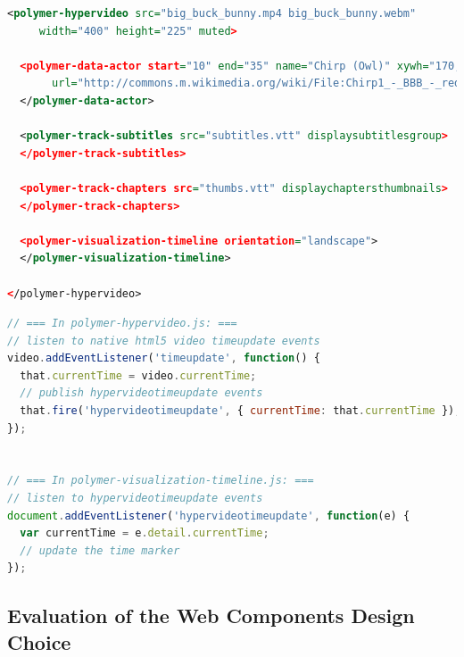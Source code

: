 \documentclass[runningheads,a4paper]{llncs}
\begin{document}
\begin{lstlisting}[caption={Web Components mark-up for the hypervideo in \autoref{fig:screenshot}, including subtitles, chapters, timeline, and table of contents; the actor annotation contains a~spatial fragment
(\texttt{xywh})~\cite{troncy2012mediafragments} and a~link (\texttt{url})
  to Wikimedia Commons},
  label=listing:polymer, language=xml,
  float=b!, stringstyle=\color{gray},morekeywords={polymer,hypervideo,track,subtitles,chapters,toc,timeline,visualization,data,actor,src,end,start,name,url,width,height,muted,displaysubtitlesgroup,orientation,displaychaptersthumbnails,xywh}]
<polymer-hypervideo src="big_buck_bunny.mp4 big_buck_bunny.webm"
     width="400" height="225" muted>
    
  <polymer-data-actor start="10" end="35" name="Chirp (Owl)" xywh="170,20,70,80" 
       url="http://commons.m.wikimedia.org/wiki/File:Chirp1_-_BBB_-_reduced_snapshot.png">
  </polymer-data-actor>

  <polymer-track-subtitles src="subtitles.vtt" displaysubtitlesgroup>
  </polymer-track-subtitles>

  <polymer-track-chapters src="thumbs.vtt" displaychaptersthumbnails>
  </polymer-track-chapters>

  <polymer-visualization-timeline orientation="landscape">
  </polymer-visualization-timeline>
  
</polymer-hypervideo>
\end{lstlisting}

\begin{lstlisting}[caption={Native JavaScript event communication
  between Web Components},
  label=listing:events, language=JavaScript,
  float=b!, stringstyle=\color{gray},morekeywords={addEventListener,document}]
// === In polymer-hypervideo.js: ===
// listen to native html5 video timeupdate events
video.addEventListener('timeupdate', function() {
  that.currentTime = video.currentTime;
  // publish hypervideotimeupdate events
  that.fire('hypervideotimeupdate', { currentTime: that.currentTime });
});


// === In polymer-visualization-timeline.js: ===
// listen to hypervideotimeupdate events
document.addEventListener('hypervideotimeupdate', function(e) {
  var currentTime = e.detail.currentTime;
  // update the time marker
});
\end{lstlisting}

\subsection{Evaluation of the Web Components Design Choice}
\end{document}
